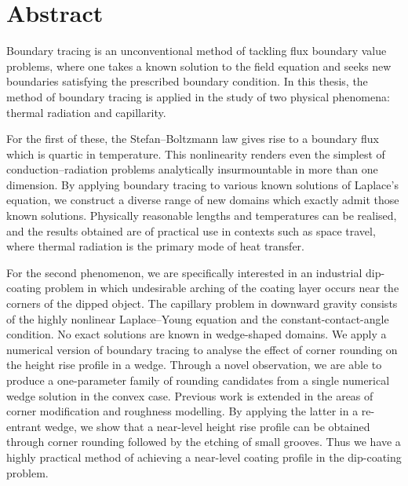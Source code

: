 \chapter{Abstract}
\label{ch:abstract}

Boundary tracing is an unconventional method
of tackling flux boundary value problems,
where one takes a known solution to the field equation
and seeks new boundaries satisfying the prescribed boundary condition.
In this thesis, the method of boundary tracing is applied
in the study of two physical phenomena:
thermal radiation and capillarity.

For the first of these,
the Stefan--Boltzmann law gives rise
to a boundary flux which is quartic in temperature.
This nonlinearity renders
even the simplest of conduction--radiation problems
analytically insurmountable in more than one dimension.
By applying boundary tracing to various known solutions of Laplace's equation,
we construct a diverse range of new domains
which exactly admit those known solutions.
Physically reasonable lengths and temperatures can be realised,
and the results obtained are of practical use
in contexts such as space travel,
where thermal radiation is the primary mode of heat transfer.

For the second phenomenon,
we are specifically interested in an industrial dip-coating problem
in which undesirable arching of the coating layer
occurs near the corners of the dipped object.
The capillary problem in downward gravity
consists of the highly nonlinear Laplace--Young equation
and the constant-contact-angle condition.
No exact solutions are known in wedge-shaped domains.
We apply a numerical version of boundary tracing
to analyse the effect of corner rounding
on the height rise profile in a wedge.
Through a novel observation,
we are able to produce a one-parameter family of rounding candidates
from a single numerical wedge solution in the convex case.
Previous work is extended
in the areas of corner modification and roughness modelling.
By applying the latter in a re-entrant wedge,
we show that a near-level height rise profile can be obtained
through corner rounding followed by the etching of small grooves.
Thus we have a highly practical method
of achieving a near-level coating profile
in the dip-coating problem.

